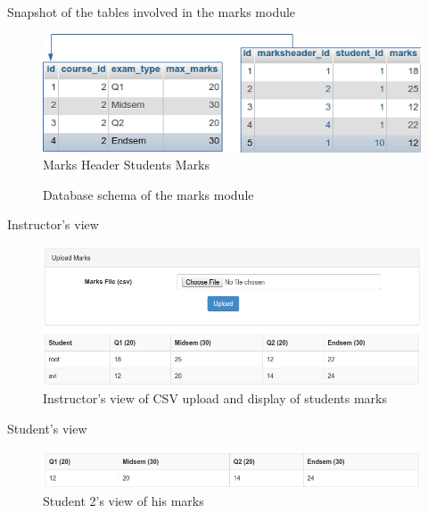 \documentclass{beamer}
\begin{document}
\begin{frame}{Snapshot of the tables involved in the marks module}
	\begin{figure}
		\centering
		\includegraphics[width=0.8\linewidth]{media/marksdb} \\
		Marks Header \hspace{2cm} Students Marks
		\caption{Database schema of the marks module}
		\label{fig:marksdb}
	\end{figure}
	
\end{frame}

\begin{frame}{Instructor's view}
	\begin{figure}
		\centering
		\includegraphics[width=0.8\linewidth]{media/marksi}
		\caption{Instructor's view of CSV upload and display of students marks}
		\label{fig:marksi}
	\end{figure}
\end{frame}

\begin{frame}{Student's view}
	\begin{figure}
		\centering
		\includegraphics[width=0.8\linewidth]{media/markss1}
		\caption{Student 2's view of his marks}
		\label{fig:markss1}
	\end{figure}
\end{frame}
\end{document}

